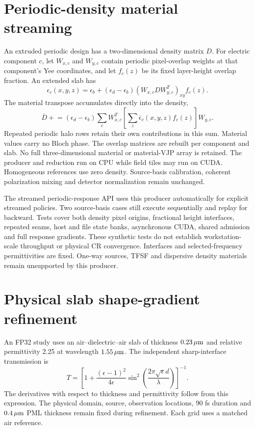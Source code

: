 \documentclass[11pt,a4paper]{article}
\begin{document}
\section{Periodic-density material streaming}
An extruded periodic design has a two-dimensional density matrix $D$.
For electric component $c$, let $W_{x,c}$ and $W_{y,c}$ contain periodic
pixel-overlap weights at that component's Yee coordinates, and let $f_c(z)$
be its fixed layer-height overlap fraction. An extended slab has
\begin{equation}
 \epsilon_c(x,y,z)=\epsilon_b+
 (\epsilon_d-\epsilon_b)(W_{x,c}D W_{y,c}^{T})_{xy}f_c(z).
\end{equation}
The material transpose accumulates directly into the density,
\begin{equation}
 \overline D \mathrel{+}=
 (\epsilon_d-\epsilon_b)\sum_c W_{x,c}^{T}
 \left[\sum_z\overline\epsilon_c(x,y,z)f_c(z)\right] W_{y,c}.
\end{equation}
Repeated periodic halo rows retain their own contributions in this sum.
Material values carry no Bloch phase. The overlap matrices are rebuilt per
component and slab. No full three-dimensional material or material-VJP array
is retained. The producer and reduction run on CPU while field tiles may run
on CUDA. Homogeneous references use zero density. Source-basis calibration,
coherent polarization mixing and detector normalization remain unchanged.

The streamed periodic-response API uses this producer automatically for
explicit streamed policies. Two source-basis cases still execute sequentially
and replay for backward. Tests cover both density pixel origins, fractional
height interfaces, repeated seams, host and file state banks, asynchronous
CUDA, shared admission and full response gradients. These synthetic tests
do not establish workstation-scale throughput or physical CR convergence.
Interfaces and selected-frequency permittivities are fixed. One-way sources,
TFSF and dispersive density materials remain unsupported by this producer.

\section{Physical slab shape-gradient refinement}
An FP32 study uses an air--dielectric--air slab of thickness
$0.23\,\mu{\rm m}$ and relative permittivity 2.25 at wavelength
$1.55\,\mu{\rm m}$. The independent sharp-interface transmission is
\begin{equation}
T=\left[1+\frac{(\epsilon-1)^2}{4\epsilon}
\sin^2\left(\frac{2\pi\sqrt{\epsilon}d}{\lambda}\right)\right]^{-1}.
\end{equation}
The derivatives with respect to thickness and permittivity follow from this
expression. The physical domain, source, observation locations, 90 fs
duration and $0.4\,\mu{\rm m}$ PML thickness remain fixed during refinement.
Each grid uses a matched air reference.
\end{document}
